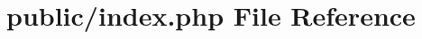 \hypertarget{public_2index_8php}{}\section{public/index.php File Reference}
\label{public_2index_8php}

